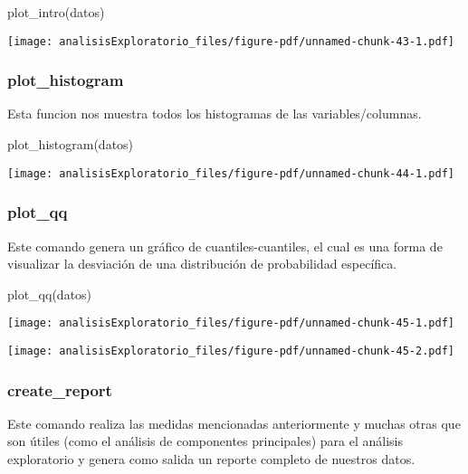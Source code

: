 \documentclass[
  letterpaper,
  DIV=11,
  numbers=noendperiod]{scrreprt}
\newenvironment{Shaded}{\begin{snugshade}}{\end{snugshade}}
\newcommand{\FunctionTok}[1]{\textcolor[rgb]{0.28,0.35,0.67}{#1}}
\newcommand{\NormalTok}[1]{\textcolor[rgb]{0.00,0.23,0.31}{#1}}
\begin{document}
\begin{Shaded}
\begin{Highlighting}[]
\FunctionTok{plot\_intro}\NormalTok{(datos)}
\end{Highlighting}
\end{Shaded}

\texttt{[image: analisisExploratorio\_files/figure-pdf/unnamed-chunk-43-1.pdf]}

\subsubsection{plot\_histogram}\label{plot_histogram}

Esta funcion nos muestra todos los histogramas de las
variables/columnas.

\begin{Shaded}
\begin{Highlighting}[]
\FunctionTok{plot\_histogram}\NormalTok{(datos)}
\end{Highlighting}
\end{Shaded}

\texttt{[image: analisisExploratorio\_files/figure-pdf/unnamed-chunk-44-1.pdf]}

\subsubsection{plot\_qq}\label{plot_qq}

Este comando genera un gráfico de cuantiles-cuantiles, el cual es una
forma de visualizar la desviación de una distribución de probabilidad
específica.

\begin{Shaded}
\begin{Highlighting}[]
\FunctionTok{plot\_qq}\NormalTok{(datos)}
\end{Highlighting}
\end{Shaded}

\texttt{[image: analisisExploratorio\_files/figure-pdf/unnamed-chunk-45-1.pdf]}

\texttt{[image: analisisExploratorio\_files/figure-pdf/unnamed-chunk-45-2.pdf]}

\subsubsection{create\_report}\label{create_report}

Este comando realiza las medidas mencionadas anteriormente y muchas
otras que son útiles (como el análisis de componentes principales) para
el análisis exploratorio y genera como salida un reporte completo de
nuestros datos.
\end{document}
